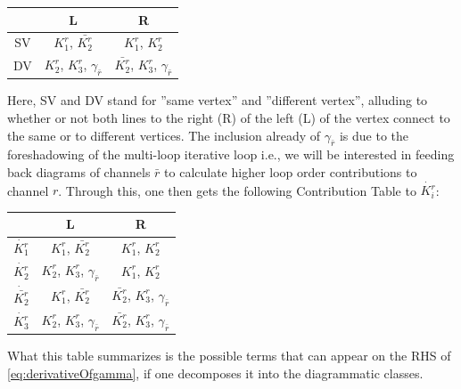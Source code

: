 \documentclass[12pt,a4paper,roman]{article}
\begin{document}
\begin{center}
\begin{tabular}{| c| | c | c|} 
\hline
          &  L & R \\ 
          \hline\hline
 SV   & $K_1^r$, $\bar{K_2^r}$ &  $K_1^r$, $K_2^r$\\ 
  DV & $K_2^r$, $K_3^r$, $\gamma_{\bar{r}}$  & $\bar{K_2^r}$, $K_3^r$, $\gamma_{\bar{r}}$\\ 
 \hline
\end{tabular}
\end{center}
Here, SV and DV stand for ''same vertex'' and ''different vertex'', alluding to whether or not both lines to the right (R) of the left (L) of the vertex connect to the same or to different vertices. The inclusion already of $\gamma_{\bar{r}}$ is due to the foreshadowing of the multi-loop iterative loop i.e., we will be interested in feeding back diagrams of channels $\bar{r}$ to calculate higher loop order contributions to channel $r$.
Through this, one then gets the following Contribution Table to $\dot{K_i^r}$:

\begin{center}
\begin{tabular}{| c| | c | c|} 
\hline
          &  L & R \\ 
          \hline\hline
 $\dot{K_1^r}$  & $K_1^r$, $\bar{K_2^r}$&  $K_1^r$, $K_2^r$\\ 
 $\dot{K_2^r}$ & $K_2^r$, $K_3^r$, $\gamma_{\bar{r}}$  & $K_1^r$, $K_2^r$\\
 $\dot{\bar{K_2^r}}$ & $K_1^r$, $\bar{K_2^r}$ & $\bar{K_2^r}$, $K_3^r$, $\gamma_{\bar{r}}$\\ 
 $\dot{K_3^r}$ &  $K_2^r$, $K_3^r$, $\gamma_{\bar{r}}$   & $\bar{K_2^r}$, $K_3^r$, $\gamma_{\bar{r}}$\\
 \hline
\end{tabular}
\end{center}

What this table summarizes is the possible terms that can appear on the RHS of \ref{eq:derivativeOfgamma}, if one decomposes it into the diagrammatic classes.
\end{document}

